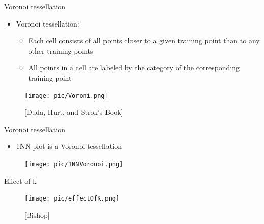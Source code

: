 \documentclass[serif, aspectratio=169]{beamer}
\begin{document}
\begin{frame}{Voronoi tessellation}

    \begin{itemize}
        \item Voronoi tessellation:
         \begin{itemize}
             \item Each cell consists of all points closer to a given training point than to any other training points
             \item All points in a cell are labeled by the category of the corresponding training point
         \end{itemize}
         
         
    \end{itemize}
    \begin{figure}[h]
            \centering
            
            \texttt{[image: pic/Voroni.png]}
            \caption* { \scriptsize [Duda, Hurt, and Strok’s Book]}
            \end{figure}
\end{frame}
\begin{frame}{Voronoi tessellation}
    \begin{itemize}
        \item 1NN plot is a Voronoi tessellation
    \end{itemize}
    
    \begin{figure}[h]
            \centering
            
            \texttt{[image: pic/1NNVoronoi.png]}
            \end{figure}
            
    \vfill
\end{frame}
\begin{frame}{Effect of k}
    \begin{figure}[h]
            \centering
            
            \texttt{[image: pic/effectOfK.png]}
            \caption* { \scriptsize [Bishop]}
            \end{figure}
\end{frame}
\end{document}
